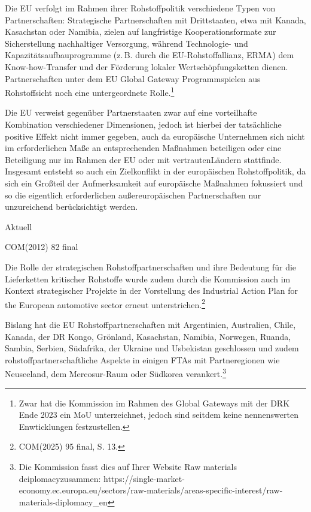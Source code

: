 \documentclass[12pt,a4paper,oneside]{book} %
\begin{document}
Die EU verfolgt im Rahmen ihrer Rohstoffpolitik verschiedene Typen von Partnerschaften: Strategische Partnerschaften mit Drittstaaten, etwa mit Kanada, Kasachstan oder Namibia, zielen auf langfristige Kooperationsformate zur Sicherstellung nachhaltiger Versorgung, während Technologie- und Kapazitätsaufbauprogramme (z. B. durch die EU-Rohstoffallianz, ERMA)  dem Know-how-Transfer und der Förderung lokaler Wertschöpfungsketten dienen. Partnerschaften unter dem EU \glqq Global Gateway Programm\grqq spielen aus Rohstoffsicht noch eine untergeordnete Rolle.\footnote{Zwar hat die Kommission im Rahmen des Global Gateways mit der DRK Ende 2023 ein MoU unterzeichnet, jedoch sind seitdem keine nennenswerten Enwticklungen festzustellen.}

Die EU verweist gegenüber Partnerstaaten zwar auf eine vorteilhafte Kombination verschiedener Dimensionen, jedoch ist hierbei der tatsächliche positive Effekt nicht immer gegeben, auch da europäische Unternehmen sich nicht im erforderlichen Maße an entsprechenden Maßnahmen beteiligen oder eine Beteiligung nur im Rahmen der EU oder mit \glqq vertrauten\grqq Ländern stattfinde.\autocite{KAS: Vom Rohstoff zur Lieferkette, S. 35} Insgesamt entsteht so auch ein Zielkonflikt in der europäischen Rohstoffpolitik, da sich ein Großteil der Aufmerksamkeit auf europäische Maßnahmen fokussiert und so die eigentlich erforderlichen außereuropäischen Partnerschaften nur unzureichend berücksichtigt werden.\autocite{KAS: Vom Rohstoff zur Lieferkette, S. 35}

Aktuell 

COM(2012) 82 final 

Die Rolle der strategischen Rohstoffpartnerschaften und ihre Bedeutung für die Lieferketten kritischer Rohstoffe wurde zudem durch die Kommission auch im Kontext strategischer Projekte in der Vorstellung des Industrial Action Plan for the European automotive sector erneut unterstrichen.\footnote{COM(2025) 95 final, S. 13.}

Bislang hat die EU Rohstoffpartnerschaften mit Argentinien, Australien, Chile, Kanada, der DR Kongo, Grönland, Kasachstan, Namibia, Norwegen, Ruanda, Sambia, Serbien, Südafrika, der Ukraine und Usbekistan geschlossen und zudem rohstoffpartnerschaftliche Aspekte in einigen FTAs mit Partneregionen wie Neuseeland, dem Mercosur-Raum oder Südkorea verankert.\footnote{Die Kommission fasst dies auf Ihrer Website \glqq Raw materials deiplomacy\grqq zusammen: https://single-market-economy.ec.europa.eu/sectors/raw-materials/areas-specific-interest/raw-materials-diplomacy_en}
\end{document}
